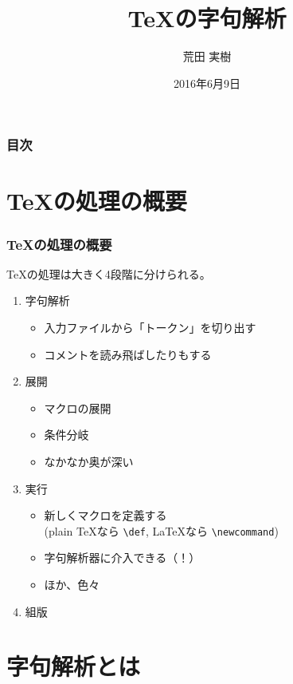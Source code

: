 \documentclass{beamer}
\title{\TeX の字句解析}
\author{荒田 実樹}
\date{2016年6月9日}
\begin{document}
\begin{frame}\frametitle{}
  \titlepage
\end{frame}

\begin{frame}\frametitle{目次}
  \tableofcontents
\end{frame}

\section{\TeX の処理の概要}
\begin{frame}[fragile]\frametitle{\TeX の処理の概要}
  \TeX の処理は大きく4段階に分けられる。
  \begin{enumerate}
  \item 字句解析%
    \begin{itemize}
    \item 入力ファイルから「トークン」を切り出す
    \item コメントを読み飛ばしたりもする
    \end{itemize}
  \item 展開%
    \begin{itemize}
    \item マクロの展開
    \item 条件分岐
    \item なかなか奥が深い
    \end{itemize}
  \item 実行%
    \begin{itemize}
    \item 新しくマクロを定義する \\
      (plain \TeX なら \verb|\def|, \LaTeX なら \verb|\newcommand|)
    \item 字句解析器に介入できる（！）
    \item ほか、色々
    \end{itemize}
  \item 組版%
  \end{enumerate}
\end{frame}

\section{字句解析とは}

\newcommand\ignoredspace{{\color{blue}\fboxsep=0.1pt\fboxrule=0.3pt\fbox{\vphantom{(\{M;}\color{black}\textvisiblespace}}}
\end{document}

